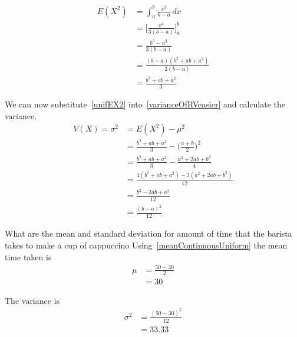 \begin{align}
E(X^{2})	& =	\int_{a}^{b} \frac{x^{2}}{b - a}   \, dx			\\[1.5mm]
		& =	\bigg[ \frac{x^{3}}{3(b-a)} \bigg]^{b}_{a}		\\[1.5mm]
		& =	\frac{b^{3} - a^{3}}{3(b-a)}					\\[1.5mm]
		& = 	\frac{ (b - a)(b^{2} + ab + a^{2})}{2(b-a)}		\\[1.5mm]
		& =	\frac{b^{2} + ab + a^{2}}{3}	\label{unifEX2}
\end{align}

\noindent
We can now substitute~\ref{unifEX2} into~\ref{varianceOfRVeasier} and calculate the variance.
\begin{align}
V(X) = \sigma^2	& = 	E(X^{2}) - \mu^{2}									\\[1.5mm]
				& =	\frac{b^{2} + ab + a^{2}}{3} - \bigg( \frac{a + b}{2} \bigg)^{2}	\\[1.5mm]
				& =	\frac{b^{2} + ab + a^{2}}{3} - \frac{a^{2} + 2ab + b^{2}}{4}		\\[1.5mm]
				& =	\frac{ 4(b^{2} + ab + a^{2}) - 3(a^{2} + 2ab + b^{2}) }{12}		\\[1.5mm]
				& =	\frac{ b^{2} - 2ab + a^{2} }{12}							\\[1.5mm]
				& =	\frac{(b - a)^{2}}{12}
\end{align}






\begin{example}{What are the mean and standard deviation for amount of time that the barista takes to make
a cup of cappuccino}\label{UniformBaristaExampleMeanSD}
Using~\ref{meanContinuousUniform} the mean time taken is
\begin{align*}
\mu	& = 	\frac{50-30}{2}		\\
	& =	30
\end{align*}

The variance is 
\begin{align*}
\sigma^{2}		& =	\frac{(50-30)^{2}}{12}		\\
			& =	33.33
\end{align*}
\end{example}

